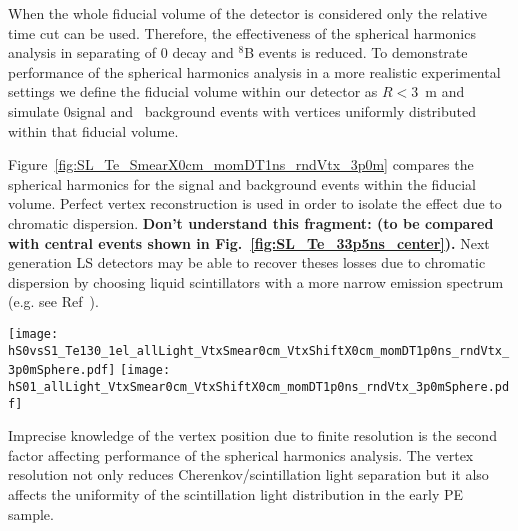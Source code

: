 When the whole fiducial volume of the detector is considered only the relative time cut can be used. Therefore, the effectiveness of the spherical harmonics analysis in separating of 0{\nbb} decay and $^{8}$B events is reduced. To demonstrate performance of the spherical harmonics analysis in a  more realistic experimental settings we define the fiducial volume within our detector as $R<3$~m and simulate 0\nbb signal and \B~background events with vertices uniformly distributed within that fiducial volume.

Figure~\ref{fig:SL_Te_SmearX0cm_momDT1ns_rndVtx_3p0m} compares the spherical harmonics for the signal and background events within the fiducial volume. Perfect vertex reconstruction is used in order to isolate the effect due to chromatic dispersion.   {\bf Don't understand this fragment: (to be compared with central events shown in Fig.~\ref{fig:SL_Te_33p5ns_center}).} Next generation LS detectors may be able to recover theses losses due to chromatic dispersion by choosing liquid scintillators with a more narrow emission spectrum (e.g. see Ref~\cite{LS_narrow_emission}).

\begin{figure*}[h]
  \centering
  \texttt{[image: hS0vsS1\_Te130\_1el\_allLight\_VtxSmear0cm\_VtxShiftX0cm\_momDT1p0ns\_rndVtx\_3p0mSphere.pdf]}
  \texttt{[image: hS01\_allLight\_VtxSmear0cm\_VtxShiftX0cm\_momDT1p0ns\_rndVtx\_3p0mSphere.pdf]}
  \caption{Spherical harmonics comparison between $^{130}$Te 0{\nbb}
    decay signal ($Q=2.529$~MeV) (\emph{red}) and $^{8}$B solar
    neutrinos background (\emph{blue}) for 1000 simulated
    events.Verticies are uniformly distributed within the fiducial
    volume, $R<3$~m. $^8$Be events are implemented as 2.529~MeV
    electrons with the initial momentum direction uniformly
    distributed within 4$\pi$ solid angle. Perfect vertex
    reconstruction - true vertex position is used. \emph{Left:} $S_0$
    versus $S_1$ scatter plot. Black dotted line is a linear fit of
    these 2D histograms. Variable $S_{01}$ is defined as a projection
    of 2D distribution onto this linear fit. \emph{Right:} $S_{01}$}
  \label{fig:SL_Te_SmearX0cm_momDT1ns_rndVtx_3p0m}
\end{figure*}


Imprecise knowledge of the vertex position due to finite resolution is
the second factor affecting performance of the spherical harmonics
analysis. The vertex resolution not only reduces Cherenkov/scintillation light separation but it also affects the uniformity of the scintillation light distribution in the early PE sample.

